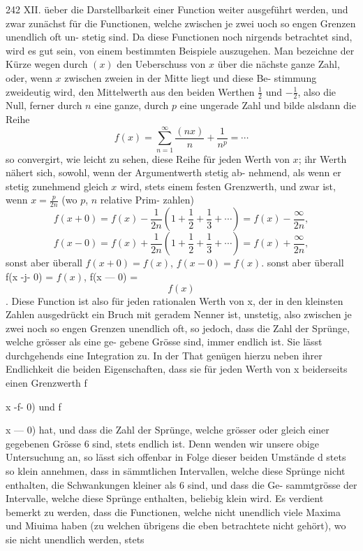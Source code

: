 \documentclass[12pt,a4paper]{book}
\theoremstyle{definition}
\theoremstyle{remark}
\begin{document}
{{%
242  XII.    üeber  die  Darstellbarkeit  einer  Function
weiter  ausgeführt  werden,  und  zwar  zunächst  für  die  Functionen,
welche  zwischen  je  zwei  uoch  so  engen  Grenzen  unendlich  oft  un-
stetig sind.
Da  diese  Functionen  noch  nirgends  betrachtet  sind,  wird  es  gut
sein,  von  einem  bestimmten  Beispiele  auszugehen.  Man  bezeichne  der
Kürze  wegen  durch  $(x)$  den  Ueberschuss  von  $x$  über  die  nächste  ganze
Zahl,  oder,  wenn  $x$  zwischen  zweien  in  der  Mitte  liegt  und  diese  Be-
stimmung zweideutig  wird,  den  Mittelwerth  aus  den  beiden  Werthen
$\frac{1}{2}$  und  $-\frac{1}{2}$,  also  die  Null,  ferner  durch  $n$  eine  ganze,  durch  $p$  eine
ungerade  Zahl  und  bilde  alsdann  die  Reihe
\[ f(x) = \sum_{n=1}^{\infty} \frac{(nx)}{n} + \frac{1}{n^p} = \cdots \]
so  convergirt,  wie  leicht  zu  sehen,  diese  Reihe  für  jeden  Werth  von  $x$;
ihr  Werth  nähert  sich,  sowohl,  wenn  der  Argumentwerth  stetig  ab-
nehmend, als  wenn  er  stetig  zunehmend  gleich  $x$  wird,  stets einem
festen  Grenzwerth,  und  zwar  ist,  wenn  $x = \frac{p}{2n}$  (wo  $p$,  $n$  relative  Prim-
zahlen)
\[ f(x+0) = f(x) - \frac{1}{2n}\left(1 + \frac{1}{2} + \frac{1}{3} + \cdots\right) = f(x) - \frac{\infty}{2n}, \]
\[ f(x-0) = f(x) + \frac{1}{2n}\left(1 + \frac{1}{2} + \frac{1}{3} + \cdots\right) = f(x) + \frac{\infty}{2n}, \]
sonst  aber  überall  $f(x+0) = f(x)$,  $f(x-0) = f(x)$.
sonst  aber  überall  f(x  -j-  0)  =  $f(x)$,  f(x  ---  0)  =  $$f(x)$$ .
Diese  Function  ist  also  für  jeden  rationalen  Werth  von  x,  der  in
den  kleinsten  Zahlen  ausgedrückt  ein  Bruch  mit  geradem  Nenner  ist,
unstetig,  also  zwischen  je  zwei  noch  so  engen  Grenzen  unendlich  oft,
so  jedoch,  dass  die  Zahl  der  Sprünge,  welche  grösser  als  eine  ge-
gebene Grösse  sind,  immer  endlich  ist.  Sie  lässt  durchgehends  eine
Integration  zu.  In  der  That  genügen  hierzu  neben  ihrer  Endlichkeit
die  beiden  Eigenschaften,  dass  sie  für  jeden  Werth  von  x  beiderseits
einen  Grenzwerth  f{x  -f-  0)  und  f{x  ---  0)  hat,  und  dass  die  Zahl  der
Sprünge,  welche  grösser  oder  gleich  einer  gegebenen  Grösse  6  sind,
stets  endlich  ist.  Denn  wenden  wir  unsere  obige  Untersuchung  an,
so  lässt  sich  offenbar  in  Folge  dieser  beiden  Umstände  d  stets  so  klein
annehmen,  dass  in  sämmtlichen  Intervallen,  welche  diese  Sprünge  nicht
enthalten,  die  Schwankungen  kleiner  als  6  sind,  und  dass  die  Ge-
sammtgrösse  der  Intervalle,  welche  diese  Sprünge  enthalten,  beliebig
klein  wird.
Es  verdient  bemerkt  zu  werden,  dass  die  Functionen,  welche  nicht
unendlich  viele  Maxima  und  Miuima  haben  (zu  welchen  übrigens  die
eben  betrachtete  nicht  gehört),  wo  sie  nicht  unendlich  werden,   stets
\newpage

}}}}
\end{document}
